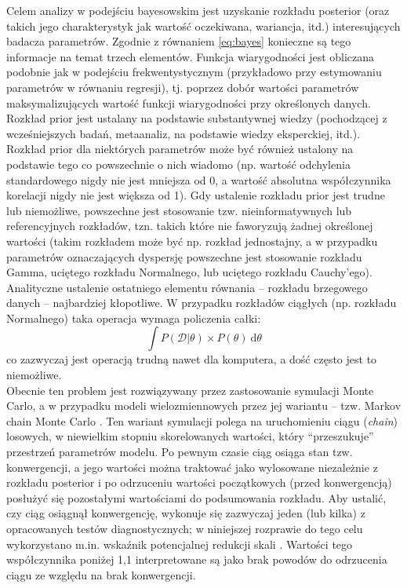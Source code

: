 \documentclass[man]{apa6}
\begin{document}
Celem analizy w podejściu bayesowskim jest uzyskanie rozkładu posterior (oraz takich jego charakterystyk jak wartość oczekiwana, wariancja, itd.) interesujących badacza parametrów. Zgodnie z równaniem \ref{eq:bayes} konieczne są tego informacje na temat trzech elementów. Funkcja wiarygodności jest obliczana podobnie jak w podejściu frekwentystycznym (przykładowo przy estymowaniu parametrów w równaniu regresji), tj. poprzez dobór wartości parametrów maksymalizujących wartość funkcji wiarygodności przy określonych danych. Rozkład prior jest ustalany na podstawie substantywnej wiedzy (pochodzącej z wcześniejszych badań, metaanaliz, na podstawie wiedzy eksperckiej, itd.). Rozkład prior dla niektórych parametrów może być również ustalony na podstawie tego co powszechnie o nich wiadomo (np. wartość odchylenia standardowego nigdy nie jest mniejsza od 0, a wartość absolutna współczynnika korelacji nigdy nie jest większa od 1). Gdy ustalenie rozkładu prior jest trudne lub niemożliwe, powszechne jest stosowanie tzw. nieinformatywnych lub referencyjnych rozkładów, tzn. takich które nie faworyzują żadnej określonej wartości (takim rozkładem może być np. rozkład jednostajny, a w przypadku parametrów oznaczających dyspersję powszechne jest stosowanie rozkładu Gamma, uciętego rozkładu Normalnego, lub uciętego rozkładu Cauchy'ego).\\

Analityczne ustalenie ostatniego elementu równania -- rozkładu brzegowego danych -- najbardziej kłopotliwe. W przypadku rozkładów ciągłych (np. rozkładu Normalnego) taka operacja wymaga policzenia całki:
\begin{equation}
    \int P(\mathcal{D} | \theta)\times P(\theta)\ \mathrm{d}\theta
\end{equation}
co zazwyczaj jest operacją trudną nawet dla komputera, a dość często jest to niemożliwe. \\

Obecnie ten problem jest rozwiązywany przez zastosowanie symulacji Monte Carlo, a w przypadku modeli wielozmiennowych przez jej wariantu -- tzw. Markov chain Monte Carlo \parencite[MCMC,][]{hastings1970monte}. Ten wariant symulacji polega na uruchomieniu ciągu (\emph{chain}) losowych, w niewielkim stopniu skorelowanych wartości, który ``przeszukuje'' przestrzeń parametrów modelu. Po pewnym czasie ciąg osiąga stan tzw. konwergencji, a jego wartości można traktować jako wylosowane niezależnie z rozkładu posterior i po odrzuceniu wartości początkowych (przed konwergencją) posłużyć się pozostałymi wartościami do podsumowania rozkładu. Aby ustalić, czy ciąg osiągnął konwergencję, wykonuje się zazwyczaj jeden (lub kilka) z opracowanych testów diagnostycznych; w niniejszej rozprawie do tego celu wykorzystano m.in. wskaźnik potencjalnej redukcji skali \parencite[\emph{potential scale reduction factor},][]{gelman1992inference}. Wartości tego współczynnika poniżej 1,1 interpretowane są jako brak powodów do odrzucenia ciągu ze względu na brak konwergencji.\\
\end{document}
